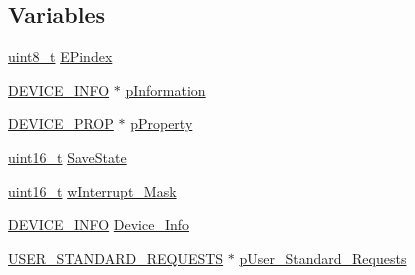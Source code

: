 \subsection*{Variables}
\begin{DoxyCompactItemize}
\item 
\hyperlink{stdint_8h_aba7bc1797add20fe3efdf37ced1182c5}{uint8\-\_\-t} \hyperlink{_s_t_m32_f30x_2_libraries_2_s_t_m32___u_s_b-_f_s-_device___driver_2src_2usb__init_8c_a227b4da72d62002d4c00ea5e82ba83c9}{E\-Pindex}
\item 
\hyperlink{_s_t_m32_f10x_2_libraries_2_s_t_m32___u_s_b-_f_s-_device___driver_2inc_2usb__core_8h_a6c959d0e0181f5f4b6a8b6b3f8e16760}{D\-E\-V\-I\-C\-E\-\_\-\-I\-N\-F\-O} $\ast$ \hyperlink{_s_t_m32_f30x_2_libraries_2_s_t_m32___u_s_b-_f_s-_device___driver_2src_2usb__init_8c_aee2c852e2abf0858434a286864925289}{p\-Information}
\item 
\hyperlink{_s_t_m32_f10x_2_libraries_2_s_t_m32___u_s_b-_f_s-_device___driver_2inc_2usb__core_8h_a90353becd4185446508b796a7f39fbce}{D\-E\-V\-I\-C\-E\-\_\-\-P\-R\-O\-P} $\ast$ \hyperlink{_s_t_m32_f30x_2_libraries_2_s_t_m32___u_s_b-_f_s-_device___driver_2src_2usb__init_8c_a097ddc79931f5731f55b4c7d4874ea7e}{p\-Property}
\item 
\hyperlink{stdint_8h_a273cf69d639a59973b6019625df33e30}{uint16\-\_\-t} \hyperlink{_s_t_m32_f30x_2_libraries_2_s_t_m32___u_s_b-_f_s-_device___driver_2src_2usb__init_8c_af8f4742d656fff9ee1db1ef79a53150a}{Save\-State}
\item 
\hyperlink{stdint_8h_a273cf69d639a59973b6019625df33e30}{uint16\-\_\-t} \hyperlink{_s_t_m32_f30x_2_libraries_2_s_t_m32___u_s_b-_f_s-_device___driver_2src_2usb__init_8c_a6304592c11373c53999f23226cb5e5d7}{w\-Interrupt\-\_\-\-Mask}
\item 
\hyperlink{_s_t_m32_f10x_2_libraries_2_s_t_m32___u_s_b-_f_s-_device___driver_2inc_2usb__core_8h_a6c959d0e0181f5f4b6a8b6b3f8e16760}{D\-E\-V\-I\-C\-E\-\_\-\-I\-N\-F\-O} \hyperlink{_s_t_m32_f30x_2_libraries_2_s_t_m32___u_s_b-_f_s-_device___driver_2src_2usb__init_8c_aafdb1c0ee02432099324e826f25d0844}{Device\-\_\-\-Info}
\item 
\hyperlink{_s_t_m32_f10x_2_libraries_2_s_t_m32___u_s_b-_f_s-_device___driver_2inc_2usb__core_8h_abf9887b82ae511cfb155d0d97c9a7c1a}{U\-S\-E\-R\-\_\-\-S\-T\-A\-N\-D\-A\-R\-D\-\_\-\-R\-E\-Q\-U\-E\-S\-T\-S} $\ast$ \hyperlink{_s_t_m32_f30x_2_libraries_2_s_t_m32___u_s_b-_f_s-_device___driver_2src_2usb__init_8c_a54cd36264ecd2640f1812a61a6d66bfb}{p\-User\-\_\-\-Standard\-\_\-\-Requests}
\end{DoxyCompactItemize}


